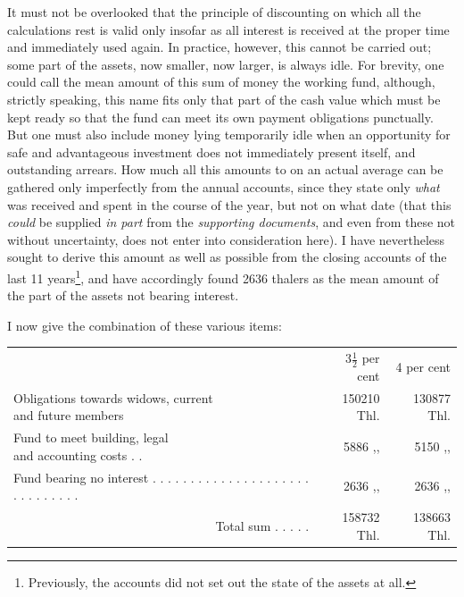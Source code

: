 It must not be overlooked that the principle of discounting on which all the calculations rest is valid only insofar as all interest is received at the proper time and immediately used again. In practice, however, this cannot be carried out; some part of the assets, now smaller, now larger, is always idle. For brevity, one could call the mean amount of this sum of money the working fund, although, strictly speaking, this name fits only that part of the cash value which must be kept ready so that the fund can meet its own payment obligations punctually. But one must also include money lying temporarily idle when an opportunity for safe and advantageous investment does not immediately present itself, and outstanding arrears. How much all this amounts to on an actual average can be gathered only imperfectly from the annual accounts, since they state only \textit{what} was received and spent in the course of the year, but not on what date (that this \textit{could} be supplied \textit{in part} from the \textit{supporting documents}, and even from these not without uncertainty, does not enter into consideration here). I have nevertheless sought to derive this amount as well as possible from the closing accounts of the last 11 years\footnote{Previously, the accounts did not set out the state of the assets at all.}, and have accordingly found 2636 thalers as the mean amount of the part of the assets not bearing interest.

I now give the combination of these various items:
\begin{center}
\fontsize{8}{9.6}\selectfont\setlength{\tabcolsep}{3pt}
\begin{tabular}{l r|r}
&\(3\tfrac{1}{2}\) per cent&4 per cent\\
\shortstack[l]{Obligations towards widows, current\\and future members}&150210 Thl.&130877 Thl.\\
\shortstack[l]{Fund to meet building, legal\\and accounting costs . .}&5886 ,, &5150 ,, \\
Fund bearing no interest . . . . . . . . . . . . . . . . . . . . . . . . . . . . . .&2636 ,, &2636 ,, \\\cline{2-3}
\multicolumn{1}{r}{Total sum . . . . .}&158732 Thl.&138663 Thl.
\end{tabular}
\end{center}

